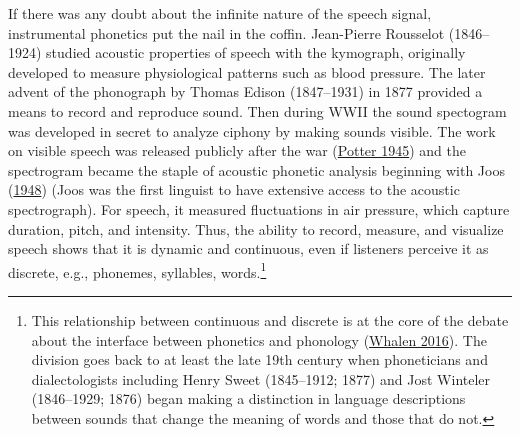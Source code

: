 \documentclass[
]{article}
\begin{document}
If there was any doubt about the infinite nature of the speech signal,
instrumental phonetics put the nail in the coffin. Jean-Pierre Rousselot
(1846--1924) studied acoustic properties of speech with the kymograph,
originally developed to measure physiological patterns such as blood
pressure. The later advent of the phonograph by Thomas Edison
(1847--1931) in 1877 provided a means to record and reproduce sound.
Then during WWII the sound spectogram was developed in secret to analyze
ciphony by making sounds visible. The work on visible speech was
released publicly after the war
(\protect\hyperlink{ref-Potter1945}{Potter 1945}) and the spectrogram
became the staple of acoustic phonetic analysis beginning with Joos
(\protect\hyperlink{ref-Joos1948}{1948}) (Joos was the first linguist to
have extensive access to the acoustic spectrograph). For speech, it
measured fluctuations in air pressure, which capture duration, pitch,
and intensity. Thus, the ability to record, measure, and visualize
speech shows that it is dynamic and continuous, even if listeners
perceive it as discrete, e.g., phonemes, syllables, words.\footnote{This
  relationship between continuous and discrete is at the core of the
  debate about the interface between phonetics and phonology
  (\protect\hyperlink{ref-Whalen2019}{Whalen 2016}). The division goes
  back to at least the late 19th century when phoneticians and
  dialectologists including Henry Sweet (1845--1912; 1877) and Jost
  Winteler (1846--1929; 1876) began making a distinction in language
  descriptions between sounds that change the meaning of words and those
  that do not.}
\end{document}
